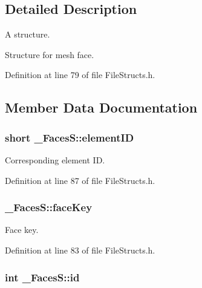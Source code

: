\subsection{Detailed Description}
A structure. 

Structure for mesh face. 

Definition at line 79 of file File\+Structs.\+h.



\subsection{Member Data Documentation}
\subsubsection[{\texorpdfstring{element\+ID}{elementID}}]{\setlength{\rightskip}{0pt plus 5cm}short \+\_\+\+Faces\+S\+::element\+ID}\hypertarget{struct___faces_s_a430ed7b14ef236bea40b0a9be2801c94}{}\label{struct___faces_s_a430ed7b14ef236bea40b0a9be2801c94}


Corresponding element ID. 



Definition at line 87 of file File\+Structs.\+h.

\subsubsection[{\texorpdfstring{face\+Key}{faceKey}}]{ \+\_\+\+Faces\+S\+::face\+Key}\hypertarget{struct___faces_s_a0b72e5930902a49f376d035d654ecef8}{}\label{struct___faces_s_a0b72e5930902a49f376d035d654ecef8}


Face key. 



Definition at line 83 of file File\+Structs.\+h.

\subsubsection[{\texorpdfstring{id}{id}}]{\setlength{\rightskip}{0pt plus 5cm}int \+\_\+\+Faces\+S\+::id}\hypertarget{struct___faces_s_a7365ff5c5951b2a61ef5e4411b0d521a}{}\label{struct___faces_s_a7365ff5c5951b2a61ef5e4411b0d521a}


